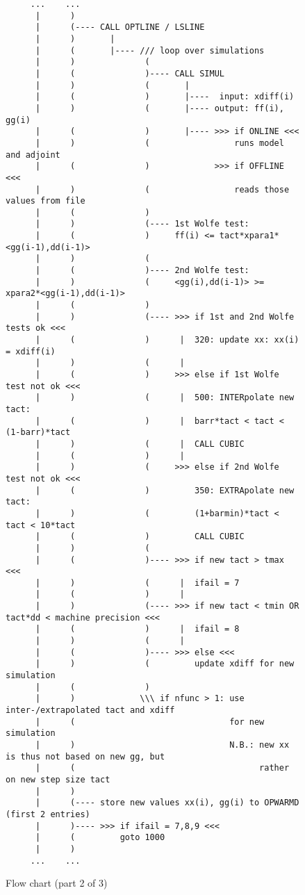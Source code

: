 \begin{figure}
%
{\scriptsize
\begin{verbatim}
     ...    ...
      |      )
      |      (---- CALL OPTLINE / LSLINE
      |      )       |
      |      (       |---- /// loop over simulations
      |      )              (  
      |      (              )---- CALL SIMUL
      |      )              (       |
      |      (              )       |----  input: xdiff(i)
      |      )              (       |---- output: ff(i), gg(i)
      |      (              )       |---- >>> if ONLINE <<<
      |      )              (                 runs model and adjoint
      |      (              )             >>> if OFFLINE <<<
      |      )              (                 reads those values from file
      |      (              )
      |      )              (---- 1st Wolfe test:
      |      (              )     ff(i) <= tact*xpara1*<gg(i-1),dd(i-1)>
      |      )              (
      |      (              )---- 2nd Wolfe test:
      |      )              (     <gg(i),dd(i-1)> >= xpara2*<gg(i-1),dd(i-1)>
      |      (              )
      |      )              (---- >>> if 1st and 2nd Wolfe tests ok <<<
      |      (              )      |  320: update xx: xx(i) = xdiff(i)
      |      )              (      |
      |      (              )     >>> else if 1st Wolfe test not ok <<<
      |      )              (      |  500: INTERpolate new tact:
      |      (              )      |  barr*tact < tact < (1-barr)*tact
      |      )              (      |  CALL CUBIC
      |      (              )      |
      |      )              (     >>> else if 2nd Wolfe test not ok <<<
      |      (              )         350: EXTRApolate new tact:
      |      )              (         (1+barmin)*tact < tact < 10*tact
      |      (              )         CALL CUBIC
      |      )              (
      |      (              )---- >>> if new tact > tmax <<<
      |      )              (      |  ifail = 7
      |      (              )      |
      |      )              (---- >>> if new tact < tmin OR tact*dd < machine precision <<<
      |      (              )      |  ifail = 8
      |      )              (      |
      |      (              )---- >>> else <<<
      |      )              (         update xdiff for new simulation
      |      (              )
      |      )             \\\ if nfunc > 1: use inter-/extrapolated tact and xdiff
      |      (                               for new simulation
      |      )                               N.B.: new xx is thus not based on new gg, but
      |      (                                     rather on new step size tact
      |      )        
      |      (---- store new values xx(i), gg(i) to OPWARMD (first 2 entries)
      |      )---- >>> if ifail = 7,8,9 <<<
      |      (         goto 1000
      |      )
     ...    ...
\end{verbatim}
}
\caption{Flow chart (part 2 of 3)}
\label{fig:lsoptflow2}
\end{figure}

